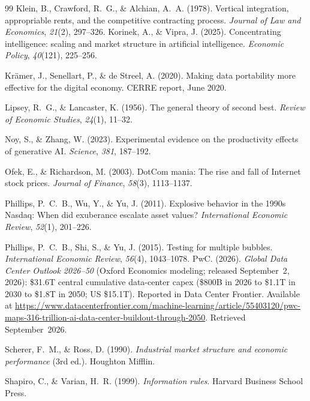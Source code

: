 \documentclass[11pt,a4paper]{article}
\begin{document}
\begin{thebibliography}{99}
Klein, B., Crawford, R.~G., \& Alchian, A.~A. (1978).
Vertical integration, appropriable rents, and the competitive contracting process.
\emph{Journal of Law and Economics}, \emph{21}(2), 297--326.
Korinek, A., \& Vipra, J. (2025).
Concentrating intelligence: scaling and market structure in artificial intelligence.
\emph{Economic Policy}, \emph{40}(121), 225--256.

Kr\"amer, J., Senellart, P., \& de Streel, A. (2020).
Making data portability more effective for the digital economy.
CERRE report, June 2020.

Lipsey, R.~G., \& Lancaster, K. (1956).
The general theory of second best.
\emph{Review of Economic Studies}, \emph{24}(1), 11--32.

Noy, S., \& Zhang, W. (2023).
Experimental evidence on the productivity effects of generative AI.
\emph{Science}, \emph{381}, 187--192.

Ofek, E., \& Richardson, M. (2003).
DotCom mania: The rise and fall of Internet stock prices.
\emph{Journal of Finance}, \emph{58}(3), 1113--1137.

Phillips, P.~C.~B., Wu, Y., \& Yu, J. (2011).
Explosive behavior in the 1990s Nasdaq: When did exuberance escalate asset values?
\emph{International Economic Review}, \emph{52}(1), 201--226.

Phillips, P.~C.~B., Shi, S., \& Yu, J. (2015).
Testing for multiple bubbles.
\emph{International Economic Review}, \emph{56}(4), 1043--1078.
PwC. (2026).
\emph{Global Data Center Outlook 2026--50} (Oxford Economics modeling;
released September~2, 2026): \$31.6T central cumulative data-center capex
(\$800B in 2026 to \$1.1T in 2030 to \$1.8T in 2050; US \$15.1T).
Reported in Data Center Frontier. Available at
\url{https://www.datacenterfrontier.com/machine-learning/article/55403120/pwc-maps-316-trillion-ai-data-center-buildout-through-2050}.
Retrieved September~2026.

Scherer, F.~M., \& Ross, D. (1990).
\emph{Industrial market structure and economic performance} (3rd ed.).
Houghton Mifflin.

Shapiro, C., \& Varian, H.~R. (1999).
\emph{Information rules}.
Harvard Business School Press.


\end{thebibliography}
\end{document}
